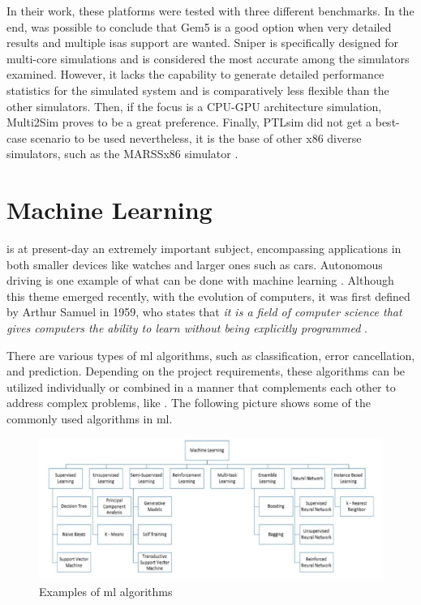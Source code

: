 In their work, these platforms were tested with three different benchmarks. In the end, was possible to conclude that Gem5 is a good option 
when very detailed results and multiple \glspl{isa} support are wanted. Sniper is specifically designed for multi-core simulations and is 
considered the most accurate among the simulators examined. However, it lacks the capability to generate detailed performance statistics for 
the simulated system and is comparatively less flexible than the other simulators. Then, if the focus is a CPU-GPU architecture simulation, 
Multi2Sim proves to be a great preference. Finally, PTLsim did not get a best-case scenario to be used nevertheless, it is the base of other 
x86 diverse simulators, such as the MARSSx86 simulator \cite{patel2011marss}.

\section{Machine Learning}

 is at present-day an extremely important subject, encompassing applications in both smaller devices like watches and larger 
ones such as cars.  Autonomous driving is one example of what can be done with machine learning \cite{bachute2021autonomous}. Although this 
theme emerged recently, with the evolution of computers, it was first defined by Arthur Samuel in 1959, who states that 
\textit{ it is a field of computer science that gives computers the ability to learn without being explicitly programmed }\cite{samuel1959some}. 

There are various types of \gls{ml} algorithms, such as classification, error cancellation, and prediction. Depending on the project 
requirements, these algorithms can be utilized individually or combined in a manner that complements each other to address complex problems, 
like \cite{bachute2021autonomous}. The following picture shows some of the commonly used algorithms in \gls{ml}.

\begin{figure}[H]
	\centering
 	\includegraphics[width=0.9\linewidth]{Images/TypesOfML.png}
 	\caption{Examples of \gls{ml} algorithms \cite{mahesh2020machine}}
	 \label{fig_TypesOfML}
\end{figure}

